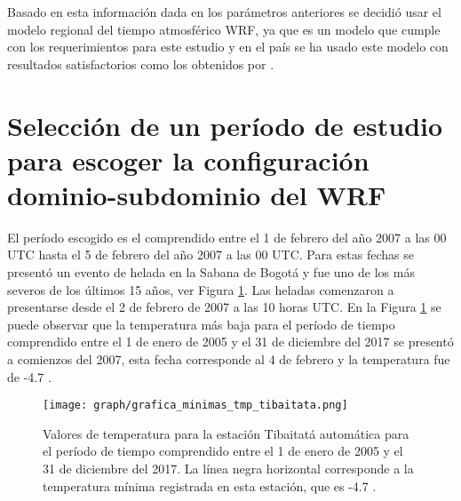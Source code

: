 
Basado en esta información dada en los parámetros anteriores se decidió usar el modelo regional del tiempo atmosférico WRF, ya que es un modelo que cumple con los requerimientos para este estudio y en el país se ha usado este modelo con resultados satisfactorios como los obtenidos por \citet{Mejia2012,Arango2011,Arango2014,Ruiz2014,Uribe2012,Rojas2011,ArmentaPorras2013}.\\

\iffalse
Los pasos a seguir para realizar una modelación con el modelo WRF consiste en:
\begin{enumerate}
\item Compilar el WPS
\item Compilar el WRF
\item Determinar el área de estudio
\item Selección de los dominios del modelo WRF para la inicializacion del modelo
\item Selección de las parametrizaciones que se van a emplear
\item Descargar los datos que van a alimentar el modelo
\item Realizar el pre-proceso con el WPS
\item Realizar el proceso de modelación con el WRF
\item Realización del pos-proceso con python3.6


\end{enumerate}
\fi

\section{Selección de un período de estudio para escoger la configuración dominio-subdominio del WRF}

El período escogido es el comprendido entre el 1 de febrero del año 2007 a las 00 UTC hasta el 5 de febrero del año 2007 a las 00 UTC. Para estas fechas se presentó un evento de helada en la Sabana de Bogotá y fue uno de los más severos de los últimos 15 años, ver Figura \ref{fig:tmp_autom_tibaitata_1}. Las heladas comenzaron a presentarse desde el 2 de febrero de 2007 a las 10 horas UTC.
En la Figura \ref{fig:tmp_autom_tibaitata_1} se puede observar que la temperatura más baja para el período de tiempo comprendido entre el 1 de enero de 2005 y el 31 de diciembre del 2017 se presentó a comienzos del 2007, esta fecha corresponde al 4 de febrero y la temperatura fue de -4.7 \celc.
\begin{figure}[H]
    \centering
    \texttt{[image: graph/grafica\_minimas\_tmp\_tibaitata.png]}
    \caption{Valores de temperatura para la estación Tibaitatá automática para el período de tiempo comprendido entre el 1 de enero de 2005 y el 31 de diciembre del 2017. La línea negra horizontal corresponde a la temperatura mínima registrada en esta estación, que es -4.7 \celc.}
    \label{fig:tmp_autom_tibaitata_1}
\end{figure}

